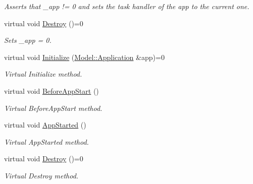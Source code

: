 \begin{DoxyCompactItemize}
\begin{DoxyCompactList}\small\item\em Asserts that \-\_\-app != 0 and sets the task handler of the app to the current one. \end{DoxyCompactList}\item 
\hypertarget{class_tunlet_a182f5368c0cd635a1ce8fe80ef4c013b}{virtual void \hyperlink{class_tunlet_a182f5368c0cd635a1ce8fe80ef4c013b}{Destroy} ()=0}\label{class_tunlet_a182f5368c0cd635a1ce8fe80ef4c013b}

\begin{DoxyCompactList}\small\item\em Sets \-\_\-app = 0. \end{DoxyCompactList}\item 
\hypertarget{class_tunlet_aeb84d0844192764dc9aef3cb905c4e7e}{virtual void \hyperlink{class_tunlet_aeb84d0844192764dc9aef3cb905c4e7e}{Initialize} (\hyperlink{class_model_1_1_application}{Model\-::\-Application} \&app)=0}\label{class_tunlet_aeb84d0844192764dc9aef3cb905c4e7e}

\begin{DoxyCompactList}\small\item\em Virtual Initialize method. \end{DoxyCompactList}\item 
\hypertarget{class_tunlet_aa4b222d6267660d272febf75c9abaa6a}{virtual void \hyperlink{class_tunlet_aa4b222d6267660d272febf75c9abaa6a}{Before\-App\-Start} ()}\label{class_tunlet_aa4b222d6267660d272febf75c9abaa6a}

\begin{DoxyCompactList}\small\item\em Virtual Before\-App\-Start method. \end{DoxyCompactList}\item 
\hypertarget{class_tunlet_a919d9ef63c660560fe23aea88eb236aa}{virtual void \hyperlink{class_tunlet_a919d9ef63c660560fe23aea88eb236aa}{App\-Started} ()}\label{class_tunlet_a919d9ef63c660560fe23aea88eb236aa}

\begin{DoxyCompactList}\small\item\em Virtual App\-Started method. \end{DoxyCompactList}\item 
\hypertarget{class_tunlet_a182f5368c0cd635a1ce8fe80ef4c013b}{virtual void \hyperlink{class_tunlet_a182f5368c0cd635a1ce8fe80ef4c013b}{Destroy} ()=0}\label{class_tunlet_a182f5368c0cd635a1ce8fe80ef4c013b}

\begin{DoxyCompactList}\small\item\em Virtual Destroy method. \end{DoxyCompactList}\end{DoxyCompactItemize}


